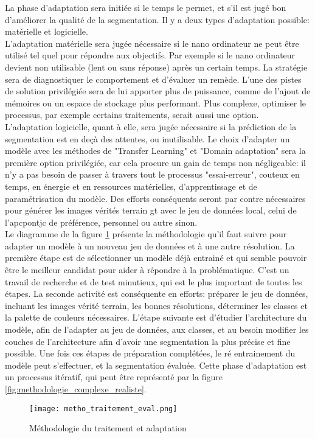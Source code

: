﻿\noindent La phase d'adaptation sera initiée si le temps le permet, et s'il est jugé bon d'améliorer la qualité de la segmentation. Il y a deux types d'adaptation possible: matérielle et logicielle.
\vspace{\baselineskip}
\\
\noindent L'adaptation matérielle sera jugée nécessaire si le nano ordinateur ne peut être utilisé tel quel pour répondre aux objectifs. Par exemple si le nano ordinateur devient non utilisable (lent ou sans réponse) après un certain temps. La stratégie sera de diagnostiquer le comportement et d'évaluer un remède. L'une des pistes de solution privilégiée sera de lui apporter plus de puissance, comme de l'ajout de mémoires ou un espace de stockage plus performant. Plus complexe, optimiser le processus, par exemple certains traitements, serait aussi une option.
\vspace{\baselineskip}
\\
\noindent L'adaptation logicielle, quant à elle, sera jugée nécessaire si la prédiction de la segmentation est en deçà des attentes, ou inutilisable. Le choix d'adapter un modèle avec les méthodes de "Transfer Learning" et "Domain adaptation" sera la première option privilégiée, car cela procure un gain de temps non négligeable: il n'y a pas besoin de passer à travers tout le processus "essai-erreur", couteux en temps, en énergie et en ressources matérielles, d'apprentissage et de paramétrisation du modèle. Des efforts conséquents seront par contre nécessaires pour générer les images vérités terrain \acrshort{gt} avec le jeu de données local, celui de l'\acrshort{apcpontjc} de préférence, personnel ou autre sinon.
\vspace{\baselineskip}
\\
\noindent Le diagramme de la figure \ref{fig:metho_adaptation} présente la méthodologie qu'il faut suivre pour adapter un modèle à un nouveau jeu de données et à une autre résolution. La première étape est de sélectionner un modèle déjà entrainé et qui semble pouvoir être le meilleur candidat pour aider à répondre à la problématique. C'est un travail de recherche et de test minutieux, qui est le plus important de toutes les étapes. La seconde activité est conséquente en efforts: préparer le jeu de données, incluant les images vérité terrain, les bonnes résolutions, déterminer les classes et la palette de couleurs nécessaires. L'étape suivante est d'étudier l'architecture du modèle, afin de l'adapter au jeu de données, aux classes, et au besoin modifier les couches de l'architecture afin d'avoir une segmentation la plus précise et fine possible. Une fois ces étapes de préparation complétées, le ré entrainement du modèle peut s'effectuer, et la segmentation évaluée. Cette phase d'adaptation est un processus itératif, qui peut être représenté par la figure \ref{fig:methodologie_complexe_realiste}.
\label{metho_adaptation}
\begin{figure}[H]
    \centering
    \texttt{[image: metho\_traitement\_eval.png]}
    \caption{Méthodologie du traitement et adaptation}
    \label{fig:metho_adaptation}
\end{figure}